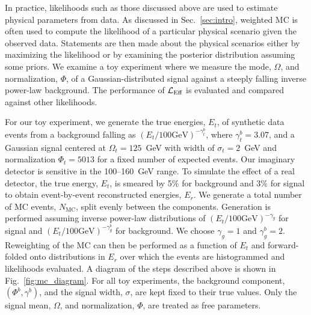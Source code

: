 In practice, likelihoods such as those discussed above are used to estimate physical parameters from data.
As discussed in Sec.~\ref{sec:intro}, weighted MC is often used to compute the likelihood of a particular physical scenario given the observed data.
Statements are then made about the physical scenarios either by maximizing the likelihood or by examining the posterior distribution assuming some priors.
We examine a toy experiment where we measure the mode, $\Omega$, and normalization, $\Phi$, of a Gaussian-distributed signal against a steeply falling inverse power-law background.
The performance of $\mathcal{L}_\textmd{Eff}$ is evaluated and compared against other likelihoods.

For our toy experiment, we generate the true energies, $E_t$, of synthetic data events from a background falling as $(E_t/100 \mathrm{GeV})^{-\gamma_t^b}$, where $\gamma_t^b=3.07$, and a Gaussian signal centered at $\Omega_t=125$~GeV with width of $\sigma_t=2$~GeV and normalization $\Phi_t=5013$ for a fixed number of expected events.
Our imaginary detector is sensitive in the 100--160~GeV range.
To simulate the effect of a real detector, the true energy, $E_t$, is smeared by 5\% for background and 3\% for signal to obtain event-by-event reconstructed energies, $E_r$.
We generate a total number of MC events, $N_{\mathrm{MC}}$, split evenly between the components.
Generation is performed assuming inverse power-law distributions of $(E_t/100 \mathrm{GeV})^{-\gamma_g}$ for signal and $(E_t/100 \mathrm{GeV})^{-\gamma_g^b}$ for background.
We choose $\gamma_g=1$ and $\gamma_g^b=2$.
Reweighting of the MC can then be performed as a function of $E_t$ and forward-folded onto distributions in $E_r$ over which the events are histogrammed and likelihoods evaluated.
A diagram of the steps described above is shown in Fig.~\ref{fig:mc_diagram}.
For all toy experiments, the background component, $(\Phi^b,\gamma^b)$, and the signal width, $\sigma$, are kept fixed to their true values.
Only the signal mean, $\Omega$, and normalization, $\Phi$, are treated as free parameters.

